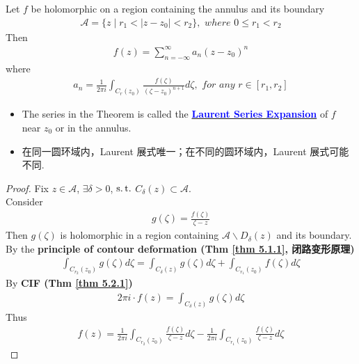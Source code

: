 \begin{thm}\label{thm 7.2.1}
	Let $f$ be holomorphic on a region containing the annulus and its boundary
	\begin{align}
		\mathcal{A} = \{ z \mid r_1 < \left| z - z_0 \right| < r_2 \}, \,\, where \,\, 0 \leq r_1 < r_2
	\end{align}
	Then
	\begin{align}
		f(z) = \sum_{n = -\infty}^{\infty}{a_n (z - z_0)^n}
	\end{align}
	where
	\begin{align}
		a_n = \frac{1}{2\pi i} \int_{C_{r}(z_0)}{\frac{f(\zeta)}{(\zeta - z_0)^{n + 1}} d\zeta} , \,\, for \,\, any \,\, r \in [r_1 , r_2]
	\end{align}
	
	\vspace{1em}
	\begin{rmk}
		\begin{itemize}
			\item The series in the Theorem is called the \underline{\textcolor{blue}{\textbf{Laurent Series Expansion}}} of $f$ near $z_0$ or in the annulus.
			
			\vspace{1em}
			
			\item 在同一圆环域内，Laurent 展式唯一；在不同的圆环域内，Laurent 展式可能不同.
		\end{itemize}
	\end{rmk}
	
	\vspace{1em}
	\begin{proof}
		Fix $z \in \mathcal{A}$, $\exists \delta > 0$, $\operatorname{s.t.}$ $C_{\delta}(z) \subset \mathcal{A}$. \\
		Consider 
		\begin{align}
			g(\zeta) = \frac{f(\zeta)}{\zeta - z}
		\end{align}
		Then $g(\zeta)$ is holomorphic in a region containing $\mathcal{A} \backslash D_{\delta}(z)$ and its boundary. \\
		By the \textbf{principle of contour deformation (Thm \ref{thm 5.1.1}, 闭路变形原理)}
		\begin{align}
			\int_{C_{r_2}(z_0)}{g(\zeta) d\zeta} = \int_{C_{\delta}(z)}{g(\zeta) d\zeta} + \int_{C_{r_1}(z_0)}{f(\zeta) d\zeta}
		\end{align}
		By \textbf{CIF (Thm \ref{thm 5.2.1})}
		\begin{align}
			2 \pi i \cdot f(z) = \int_{C_{\delta}(z)}{g(\zeta) d\zeta}
		\end{align}
		Thus
		\begin{align}
			f(z) = \frac{1}{2 \pi i} \int_{C_{r_2}(z_0)}{\frac{f(\zeta)}{\zeta - z} d\zeta} - \frac{1}{2 \pi i} \int_{C_{r_1}(z_0)}{\frac{f(\zeta)}{\zeta - z} d\zeta}
		\end{align}
		

\end{proof}
\end{thm}
